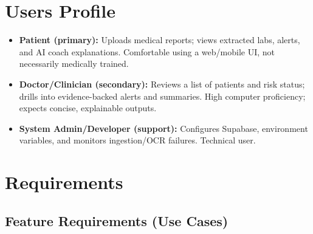 \documentclass[12pt, a4paper]{article}
\begin{document}
\section{Users Profile}
\begin{itemize}[leftmargin=*]
    \item \textbf{Patient (primary):} Uploads medical reports; views extracted labs, alerts, and AI coach explanations. Comfortable using a web/mobile UI, not necessarily medically trained.
    \item \textbf{Doctor/Clinician (secondary):} Reviews a list of patients and risk status; drills into evidence-backed alerts and summaries. High computer proficiency; expects concise, explainable outputs.
    \item \textbf{System Admin/Developer (support):} Configures Supabase, environment variables, and monitors ingestion/OCR failures. Technical user.
\end{itemize}

\section{Requirements}

\subsection{Feature Requirements (Use Cases)}
\end{document}
